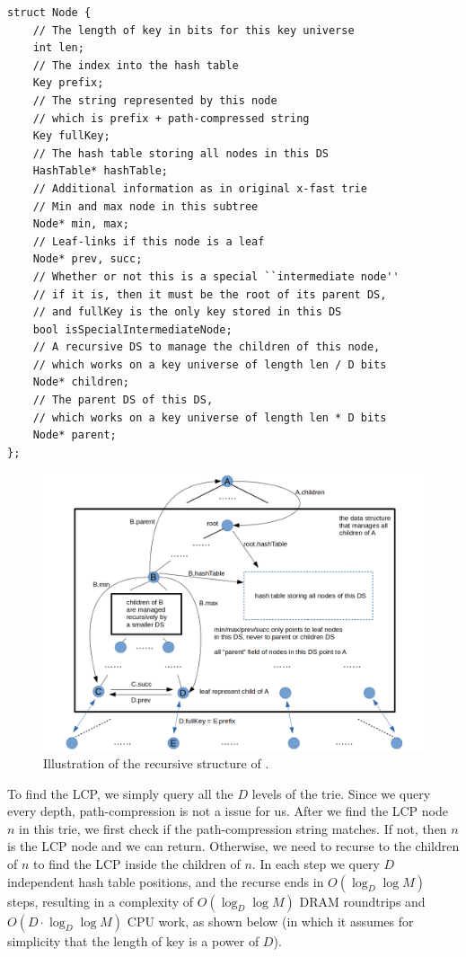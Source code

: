 \documentclass[11pt, usletter]{article}
\begin{document}
\singlespacing\begin{codebox}
\begin{verbatim}
struct Node {
    // The length of key in bits for this key universe
    int len;
    // The index into the hash table
    Key prefix;
    // The string represented by this node
    // which is prefix + path-compressed string
    Key fullKey;
    // The hash table storing all nodes in this DS
    HashTable* hashTable;
    // Additional information as in original x-fast trie
    // Min and max node in this subtree 
    Node* min, max;
    // Leaf-links if this node is a leaf
    Node* prev, succ;
    // Whether or not this is a special ``intermediate node''
    // if it is, then it must be the root of its parent DS,
    // and fullKey is the only key stored in this DS
    bool isSpecialIntermediateNode;
    // A recursive DS to manage the children of this node,
    // which works on a key universe of length len / D bits
    Node* children;
    // The parent DS of this DS, 
    // which works on a key universe of length len * D bits
    Node* parent;
};
\end{verbatim}
\end{codebox}\doublespacing

\begin{figure}[!htb]
  \includegraphics[width=\linewidth]{mlpindex_structure_illustration.png}
\caption{Illustration of the recursive structure of \MlpIndex.}
\label{mlpindex_structure_illustration}
\end{figure}

To find the LCP, we simply query all the $D$ levels of the trie. 
Since we query every depth, path-compression is not a issue for us.
After we find the LCP node $n$ in this trie, we first check if the path-compression string matches. 
If not, then $n$ is the LCP node and we can return. Otherwise, 
we need to recurse to the children of $n$ to find the LCP inside the children of $n$. 
In each step we query $D$ independent hash table positions, and the recurse ends in $O(\log_D\log M)$ steps, 
resulting in a complexity of $O(\log_D\log M)$ DRAM roundtrips and $O(D\cdot\log_D\log M)$ CPU work,
as shown below (in which it assumes for simplicity that the length of key is a power of $D$).
\end{document}
